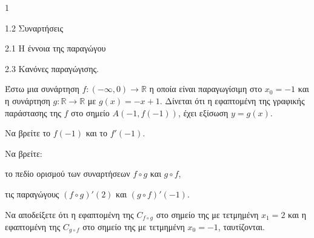 \begin{ylh}{1}
    \item 1.2 Συναρτήσεις
    \item 2.1 Η έννοια της παραγώγου
    \item 2.3 Κανόνες παραγώγισης.
\end{ylh}
Έστω μια συνάρτηση $f : (-\infty, 0) \to \mathbb{R}$ η οποία είναι παραγωγίσιμη στο $x_0 = -1$ και η συνάρτηση $g : \mathbb{R} \to \mathbb{R}$ με $g(x) = -x + 1$. Δίνεται ότι η εφαπτομένη της γραφικής παράστασης της $f$ στο σημείο $A(-1, f(-1))$, έχει εξίσωση $y = g(x)$.

\begin{alist}
\item Να βρείτε το $f(-1)$ και το $f'(-1)$. 
\item Να βρείτε:
    \begin{rlist}
    \item το πεδίο ορισμού των συναρτήσεων $f \circ g$ και $g \circ f$, 
    \item τις παραγώγους $(f \circ g)'(2)$ και $(g \circ f)'(-1)$. 
    \end{rlist}
\item Να αποδείξετε ότι η εφαπτομένη της $C_{f \circ g}$ στο σημείο της με τετμημένη $x_1 = 2$ και η εφαπτομένη της $C_{g \circ f}$ στο σημείο της με τετμημένη $x_0 = -1$, ταυτίζονται. 
\end{alist}